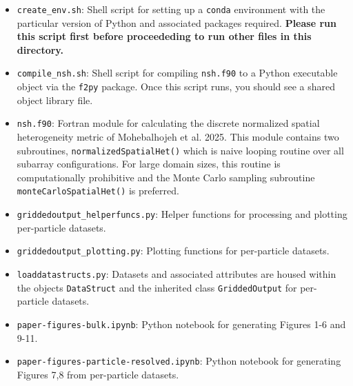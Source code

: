 \documentclass[gmd,manuscript]{copernicus}
\begin{document}
\begin{itemize}
  \item \texttt{create\_env.sh}: Shell script for setting up a \texttt{conda} environment with the particular version of Python and associated packages required. \textbf{Please run this script first before proceededing to run other files in this directory.}
  \item \texttt{compile\_nsh.sh}: Shell script for compiling \texttt{nsh.f90} to a Python executable object via the \texttt{f2py} package. Once this script runs, you should see a  shared object library file.
  \item \texttt{nsh.f90}: Fortran module for calculating the discrete normalized spatial heterogeneity metric of Mohebalhojeh et al. 2025. This module contains two subroutines, \texttt{normalizedSpatialHet()} which is naive looping routine over all subarray configurations. For large domain sizes, this routine is computationally prohibitive and the Monte Carlo sampling subroutine \texttt{monteCarloSpatialHet()} is preferred.
  \item \texttt{griddedoutput\_helperfuncs.py}: Helper functions for processing and plotting per-particle datasets.
  \item \texttt{griddedoutput\_plotting.py}: Plotting functions for per-particle datasets.
  \item \texttt{loaddatastructs.py}: Datasets and associated attributes are housed within the objects \texttt{DataStruct} and the inherited class \texttt{GriddedOutput} for per-particle datasets.
  \item \texttt{paper-figures-bulk.ipynb}: Python notebook for generating Figures 1-6 and 9-11.  
  \item \texttt{paper-figures-particle-resolved.ipynb}: Python notebook for generating Figures 7,8 from per-particle datasets. 
\end{itemize}
\end{document}
